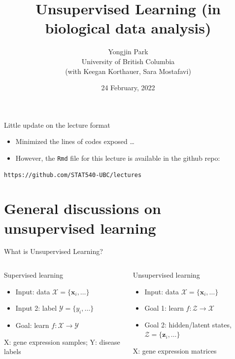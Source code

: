 \documentclass[
  ignorenonframetext,
  aspectratio=169]{beamer}
\title{Unsupervised Learning (in biological data analysis)}
\author{Yongjin Park\\
University of British Columbia\\
(with Keegan Korthauer, Sara Mostafavi)}
\date{24 February, 2022}
\begin{document}
\frame{\titlepage}

\begin{frame}[fragile]{Little update on the lecture format}
\protect\hypertarget{little-update-on-the-lecture-format}{}
\begin{itemize}
\item
  Minimized the lines of codes exposed \ldots{}
\item
  However, the \texttt{Rmd} file for this lecture is available in the
  github repo:
\end{itemize}

\begin{verbatim}
https://github.com/STAT540-UBC/lectures
\end{verbatim}
\end{frame}

\hypertarget{general-discussions-on-unsupervised-learning}{%
\section{General discussions on unsupervised
learning}\label{general-discussions-on-unsupervised-learning}}

\begin{frame}{What is Unsupervised Learning?}
\protect\hypertarget{what-is-unsupervised-learning}{}
\begin{columns}[T]
\begin{column}{.45\textwidth}
\begin{block}{Supervised learning}
\protect\hypertarget{supervised-learning}{}
\begin{itemize}
\item
  Input: data \(\mathcal{X} = \{\mathbf{x}_{i},\ldots\}\)
\item
  Input 2: label \(\mathcal{Y} = \{y_{i},\ldots\}\)
\item
  Goal: learn \(f: \mathcal{X} \to \mathcal{Y}\)
\end{itemize}
\end{block}

X: gene expression samples; Y: disease labels
\end{column}

\begin{column}{.45\textwidth}
\begin{block}{Unsupervised learning}
\protect\hypertarget{unsupervised-learning}{}
\begin{itemize}
\item
  Input: data \(\mathcal{X} = \{\mathbf{x}_{i},\ldots\}\)
\item
  Goal 1: learn \(f: \mathcal{Z} \to \mathcal{X}\)
\item
  Goal 2: hidden/latent states,
  \(\mathcal{Z} = \{\mathbf{z}_{i},\ldots\}\)
\end{itemize}
\end{block}

X: gene expression matrices
\end{column}
\end{columns}
\end{frame}
\end{document}
